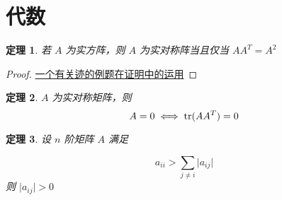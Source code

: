 \documentclass{ctexart}
\numberwithin{equation}{section}    %
\newtheorem{theorem}{定理}
\begin{document}
\section{代数}
\begin{theorem}
    若 $A$ 为实方阵，则 $A$ 为实对称阵当且仅当 $AA^T=A^2$
\end{theorem}
\begin{proof}
    \href{https://www.bilibili.com/video/BV1Ev411174v}{一个有关迹的例题在证明中的运用}
\end{proof}
\begin{theorem}
    $A$ 为实对称矩阵，则
\begin{equation}
    A=0 \iff {\rm tr}(AA^T)=0
\end{equation}
\end{theorem}
\begin{theorem}
    设 $n$ 阶矩阵 $A$ 满足

    \begin{equation}
        a_{ii}>\sum_{j\neq i}\lvert a_{ij}\rvert
        \label{eqa:主对角占优}
    \end{equation}
    则 $\lvert a_{ij}\rvert>0$ 
\end{theorem}
\end{document}
